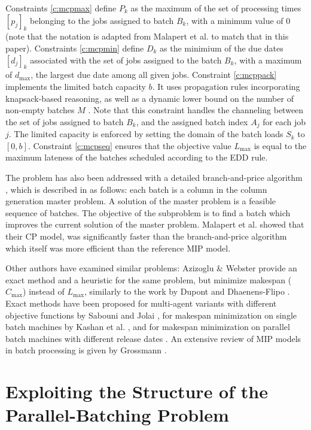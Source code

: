 \documentclass[oribibl]{llncs}
\def\Lmax{{L_{\mathrm{max}}}}
\begin{document}
Constraints \eqref{c:mcpmax} define $P_k$ as the maximum of the set
of processing times $[p_j]_k$ belonging to the jobs assigned to
batch $B_k$, with a minimum value of 0 (note that the notation is
adapted from Malapert et al. to match that in this paper). Constraints
\eqref{c:mcpmin} define $D_k$ as the minimium of the due dates $[d_j]_k$
associated with the set of jobs assigned to the batch $B_k$, with a
maximum of $d_\mathrm{max}$, the largest due date among all given jobs.
Constraint \eqref{c:mcppack} implements the limited batch capacity $b$.
It uses propagation rules incorporating knapsack-based reasoning, as
well as a dynamic lower bound on the number of non-empty batches $M$
\cite{Malapert,ShawPacking}. Note that this constraint handles the
channeling between the set of jobs assigned to batch $B_k$, and the
assigned batch index $A_j$ for each job $j$. The limited capacity is
enforced by setting the domain of the batch loads $S_k$ to $[0, b]$.
Constraint \eqref{c:mcpseq} ensures that the objective value $\Lmax$ is
equal to the maximum lateness of the batches scheduled according to the
EDD rule.

The problem has also been addressed with a detailed branch-and-price
algorithm \cite{Daste1}, which is described in \cite{Malapert} as
follows: each batch is a column in the column generation master
problem. A solution of the master problem is a feasible sequence of
batches. The objective of the subproblem is to find a batch which
improves the current solution of the master problem. Malapert et al.
\cite{Malapert} showed that their CP model, was significantly faster
than the branch-and-price algorithm which itself was more efficient 
than the reference MIP model. 

Other authors have examined similar problems: Azizoglu \& Webster
\cite{Azizoglu} provide an exact method and a heuristic for the same
problem, but minimize makespan ($C_\mathrm{max}$) instead of $\Lmax$,
similarly to the work by Dupont and Dhaenens-Flipo \cite{Dupont}.
Exact methods have been proposed for multi-agent variants
with different objective functions by Sabouni and Jolai \cite{Sabouni},
for makespan minimization on single batch machines by Kashan et al.
\cite{Kashan}, and for makespan minimization on parallel batch machines
with different release dates \cite{Ozturk}. An
extensive review of MIP models in batch processing is given
by Grossmann \cite{Grossmann}. 

\section{Exploiting the Structure of the Parallel-Batching Problem}
\label{sec:propositions}
\end{document}
